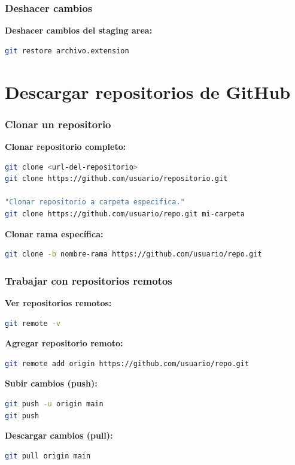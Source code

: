 \documentclass[aspectratio=169]{beamer}
\begin{document}
\begin{frame}[fragile]
\frametitle{Deshacer cambios}

    \textbf{Deshacer cambios del staging area:}
\begin{lstlisting}[language=bash]
git restore archivo.extension
\end{lstlisting}

\end{frame}

\section{Descargar repositorios de GitHub}
\begin{frame}[fragile]
\frametitle{Clonar un repositorio}
\textbf{Clonar repositorio completo:}
\begin{lstlisting}[language=bash]
git clone <url-del-repositorio>
git clone https://github.com/usuario/repositorio.git

"Clonar repositorio a carpeta especifica."
git clone https://github.com/usuario/repo.git mi-carpeta 
\end{lstlisting}

\textbf{Clonar rama específica:}
\begin{lstlisting}[language=bash]
git clone -b nombre-rama https://github.com/usuario/repo.git
\end{lstlisting}
\end{frame}

\begin{frame}[fragile]
\frametitle{Trabajar con repositorios remotos}
\textbf{Ver repositorios remotos:}
\begin{lstlisting}[language=bash]
git remote -v
\end{lstlisting}

\textbf{Agregar repositorio remoto:}
\begin{lstlisting}[language=bash]
git remote add origin https://github.com/usuario/repo.git
\end{lstlisting}

\textbf{Subir cambios (push):}
\begin{lstlisting}[language=bash]
git push -u origin main
git push
\end{lstlisting}

\textbf{Descargar cambios (pull):}
\begin{lstlisting}[language=bash]
git pull origin main
\end{lstlisting}
\end{frame}
\end{document}
